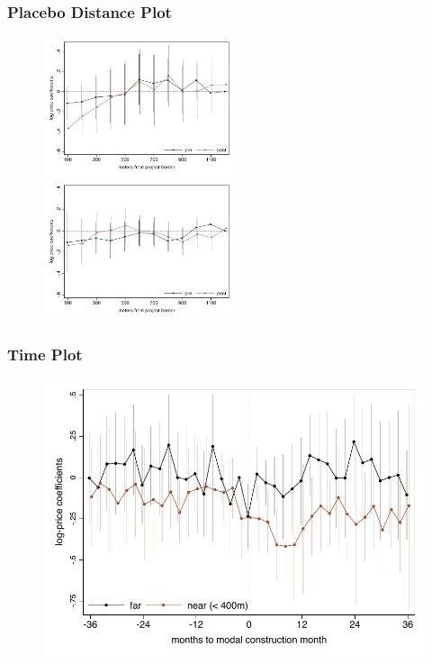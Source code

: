 \documentclass[aspectratio=149]{beamer}
\begin{document}
\begin{frame}
\frametitle{Placebo Distance Plot}
\begin{center}
\begin{figure}


\includegraphics[width=0.5\textwidth,trim={.77cm 0cm .21cm 0cm}]{distplot.pdf}
   \hfill
\includegraphics[width=0.5\textwidth,trim={.77cm 0cm .21cm 0cm},clip]{distplot_placebo.pdf}

\end{figure}
\end{center}
\end{frame}


\begin{frame}
\frametitle{Time Plot}
\begin{center}
\begin{figure}

\includegraphics[scale=0.72]{timeplot.pdf}

\end{figure}
\end{center}
\end{frame}
\end{document}
